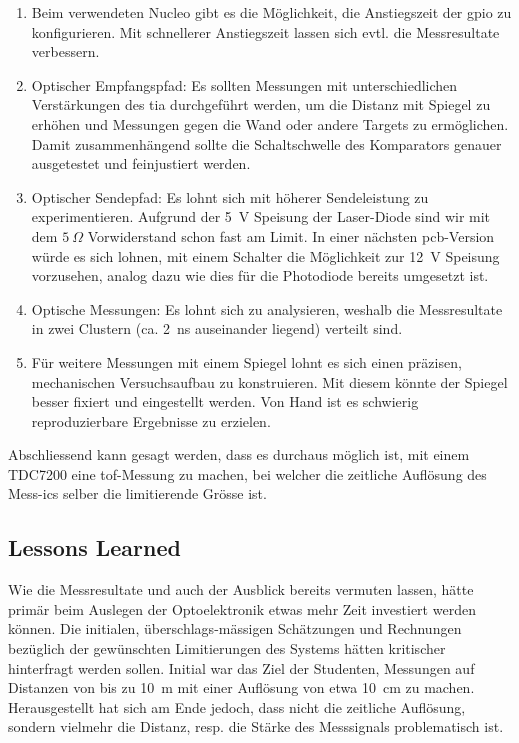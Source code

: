 \begin{enumerate}
    \item Beim verwendeten Nucleo gibt es die Möglichkeit, die Anstiegszeit der \acrshort{gpio} zu konfigurieren. Mit
          schnellerer Anstiegszeit lassen sich evtl. die Messresultate verbessern.
    \item Optischer Empfangspfad: Es sollten Messungen mit unterschiedlichen Verstärkungen des \acrshort{tia}
          durchgeführt werden, um die Distanz mit Spiegel zu erhöhen und Messungen gegen die Wand oder andere Targets zu
          ermöglichen. Damit zusammenhängend sollte die Schaltschwelle des Komparators genauer ausgetestet und
          feinjustiert werden.
    \item Optischer Sendepfad: Es lohnt sich mit höherer Sendeleistung zu experimentieren. Aufgrund der 5~V Speisung
          der Laser-Diode sind wir mit dem $5~\Omega$ Vorwiderstand schon fast am Limit. In einer nächsten
          \acrshort{pcb}-Version würde es sich lohnen, mit einem Schalter die Möglichkeit zur 12~V Speisung vorzusehen,
          analog dazu wie dies für die Photodiode bereits umgesetzt ist.
    \item Optische Messungen: Es lohnt sich zu analysieren, weshalb die Messresultate in zwei Clustern (ca. 2~ns
          auseinander liegend) verteilt sind.
    \item Für weitere Messungen mit einem Spiegel lohnt es sich einen präzisen, mechanischen Versuchsaufbau zu
          konstruieren. Mit diesem könnte der Spiegel besser fixiert und eingestellt werden. Von Hand ist es schwierig
          reproduzierbare Ergebnisse zu erzielen.
\end{enumerate}

Abschliessend kann gesagt werden, dass es durchaus möglich ist, mit einem TDC7200 eine \acrshort{tof}-Messung zu machen,
bei welcher die zeitliche Auflösung des Mess-\acrshort{ic}s selber die limitierende Grösse ist.

\subsection{Lessons Learned}

Wie die Messresultate und auch der Ausblick bereits vermuten lassen, hätte primär beim Auslegen der Optoelektronik etwas
mehr Zeit investiert werden können. Die initialen, überschlags-mässigen Schätzungen und Rechnungen bezüglich der
gewünschten Limitierungen des Systems hätten kritischer hinterfragt werden sollen. Initial war das Ziel der Studenten,
Messungen auf Distanzen von bis zu 10~m mit einer Auflösung von etwa 10~cm zu machen. Herausgestellt hat sich am Ende
jedoch, dass nicht die zeitliche Auflösung, sondern vielmehr die Distanz, resp. die Stärke des Messsignals problematisch
ist.

